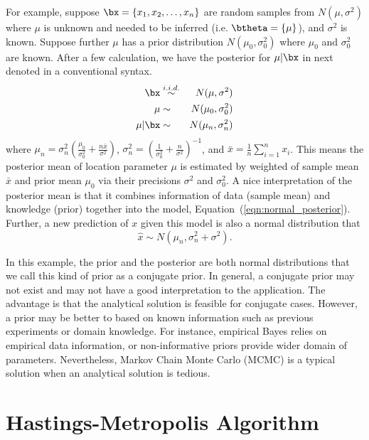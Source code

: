 For example, suppose $\bx = \{x_1, x_2, \ldots, x_n\}$ are random samples from
$N(\mu, \sigma^2)$ where $\mu$ is unknown and needed to be inferred
(i.e. $\btheta = \{\mu\}$), and
$\sigma^2$ is known. Suppose further $\mu$ has a prior distribution
$N(\mu_0, \sigma_0^2)$ where $\mu_0$ and $\sigma_0^2$ are known.
After a few calculation, we have the posterior for $\mu | \bx$ in next
denoted in a conventional syntax.
\begin{eqnarray}
\bx & \stackrel{i.i.d.}{\sim} & N(\mu, \sigma^2) \label{eqn:normal_prior} \\
\mu & \sim & N(\mu_0, \sigma_0^2) \label{eqn:normal_likelihood} \\
\mu|\bx & \sim & N(\mu_n, \sigma_n^2) \label{eqn:normal_posterior}
\end{eqnarray}
where
$\mu_n = \sigma_n^2
       \left(\frac{\mu_0}{\sigma_0^2} + \frac{n\bar{x}}{\sigma^2} \right)$,
$\sigma_n^2
 = \left(\frac{1}{\sigma_0^2} + \frac{n}{\sigma^2} \right)^{-1}$,
and $\bar{x} = \frac{1}{n} \sum_{i = 1}^n x_i$.
This means the posterior mean of location parameter $\mu$ is estimated by
weighted of sample mean $\bar{x}$ and prior mean $\mu_0$ via their precisions
$\sigma^2$ and $\sigma_0^2$. A nice interpretation of the posterior mean is
that it combines information of data (sample mean) and knowledge (prior)
together into the model, Equation~(\ref{eqn:normal_posterior}).
Further, a new prediction of $x$ given this model is also a normal
distribution that
\begin{equation}
\hat{x} \sim N(\mu_n, \sigma_n^2 + \sigma^2).
\label{eqn:normal_prediction}
\end{equation}

In this example, the prior and the posterior are both normal distributions
that we call this kind of prior as a conjugate prior.
In general, a conjugate prior may
not exist and may not have a good interpretation to the application.
The advantage is that the analytical solution is feasible for conjugate
cases. However, a prior may be better to based on known information such as
previous experiments or domain knowledge. For instance, empirical Bayes
relies on empirical data information, or non-informative priors provide
wider domain of parameters. Nevertheless,
Markov Chain Monte Carlo (MCMC)
is a typical solution when an analytical solution is tedious.


\section{Hastings-Metropolis Algorithm}

